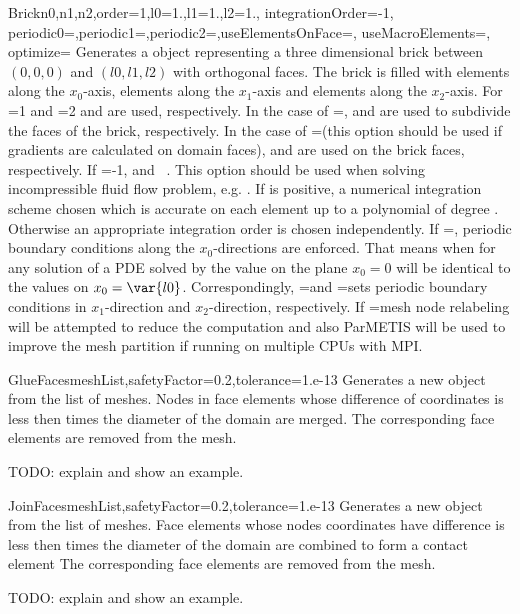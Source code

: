 \begin{funcdesc}{Brick}{n0,n1,n2,order=1,l0=1.,l1=1.,l2=1., integrationOrder=-1, \\
  periodic0=\False,periodic1=\False,periodic2=\False,useElementsOnFace=\False, useMacroElements=\False, optimize=\False}
Generates a \Domain object representing a three dimensional brick between
$(0,0,0)$ and $(l0,l1,l2)$ with orthogonal faces. The brick is filled with
 elements along the $x_0$-axis,
 elements along the $x_1$-axis and
 elements along the $x_2$-axis.
For =1 and =2
 and
 are used, respectively.
In the case of =\False,
 and
 are used to subdivide the faces of the brick, respectively.
In the case of =\True (this option should be used if gradients
are calculated on domain faces),
 and
 are used on the brick faces, respectively.
If =-1,  and ~. This option should be used when solving incompressible fluid flow problem, e.g. .
If  is positive, a numerical integration scheme
chosen which is accurate on each element up to a polynomial of
degree  . Otherwise
an appropriate integration order is chosen independently. If
=\True, periodic boundary conditions 
along the $x_0$-directions are enforced. That means when for any solution of a PDE solved by \finley
the value on the plane $x_0=0$ will be identical to the values on $x_0=\var{l0}$. Correspondingly,
=\False and =\False sets periodic boundary conditions
in $x_1$-direction and $x_2$-direction, respectively.
If =\True mesh node relabeling will be attempted to reduce the computation and also ParMETIS will be used to improve the mesh partition if running on multiple CPUs with MPI.
\end{funcdesc}

\begin{funcdesc}{GlueFaces}{meshList,safetyFactor=0.2,tolerance=1.e-13}
Generates a new \Domain object from the list  of \finley meshes.
Nodes in face elements whose difference of coordinates is less then  times the
diameter of the domain are merged. The corresponding face elements are removed from the mesh.

TODO: explain  and show an example.
\end{funcdesc}

\begin{funcdesc}{JoinFaces}{meshList,safetyFactor=0.2,tolerance=1.e-13}
Generates a new \Domain object from the list  of \finley meshes.
Face elements whose nodes coordinates have difference is less then  times the
diameter of the domain are combined to form a contact element 
The corresponding face elements are removed from the mesh.

TODO: explain  and show an example.
\end{funcdesc}
